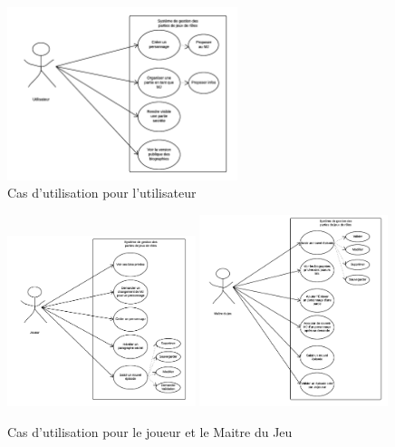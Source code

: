 \documentclass[a4paper,oneside,10pt]{article}
\begin{document}
\begin{figure}[H]
	\begin{center}
\includegraphics[width=0.6\textwidth]{images/utilisation/UserCU.png} 
	\caption{Cas d'utilisation pour l'utilisateur}
\end{center}
\end{figure}
\begin{figure}[H]
	\begin{center}
\includegraphics[width=0.49\textwidth]{images/utilisation/JoueurCU.png}
\includegraphics[width=0.49\textwidth]{images/utilisation/MJCU.png}  
	\caption{Cas d'utilisation pour le joueur et le Maitre du Jeu}
\end{center}
\end{figure}
\end{document}
